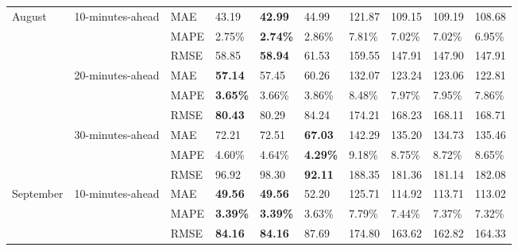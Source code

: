 {\begin{longtable}[htb!]{llllllllll}
{August}    & {10-minutes-ahead}    & MAE                       & 43.19              & \textbf{42.99}    & 44.99            & 121.87  & 109.15  & 109.19  & 108.68  \\
                           &                                      & MAPE                      & 2.75\%             & \textbf{2.74\%}   & 2.86\%           & 7.81\%  & 7.02\%  & 7.02\%  & 6.95\%  \\
                           &                                      & RMSE                      & 58.85              & \textbf{58.94}    & 61.53            & 159.55  & 147.91  & 147.90  & 147.91  \\ \cline{2-10}
                           & {20-minutes-ahead}    & MAE                       & \textbf{57.14}     & 57.45             & 60.26            & 132.07  & 123.24  & 123.06  & 122.81  \\
                           &                                      & MAPE                      & \textbf{3.65\%}    & 3.66\%            & 3.86\%           & 8.48\%  & 7.97\%  & 7.95\%  & 7.86\%  \\
                           &                                      & RMSE                      & \textbf{80.43}     & 80.29             & 84.24            & 174.21  & 168.23  & 168.11  & 168.71  \\ \cline{2-10}
                           & {30-minutes-ahead}    & MAE                       & 72.21              & 72.51             & \textbf{67.03}   & 142.29  & 135.20  & 134.73  & 135.46  \\
                           &                                      & MAPE                      & 4.60\%             & 4.64\%            & \textbf{4.29\%}  & 9.18\%  & 8.75\%  & 8.72\%  & 8.65\%  \\
                           &                                      & RMSE                      & 96.92              & 98.30             & \textbf{92.11}   & 188.35  & 181.36  & 181.14  & 182.08  \\ \hline
{September} & {10-minutes-ahead}    & MAE                       & \textbf{49.56}     & \textbf{49.56}    & 52.20            & 125.71  & 114.92  & 113.71  & 113.02  \\
                           &                                      & MAPE                      & \textbf{3.39\%}    & \textbf{3.39\%}   & 3.63\%           & 7.79\%  & 7.44\%  & 7.37\%  & 7.32\%  \\
                           &                                      & RMSE                      & \textbf{84.16}     & \textbf{84.16}    & 87.69            & 174.80  & 163.62  & 162.82  & 164.33  \\ \cline{2-10}

\end{longtable}}
